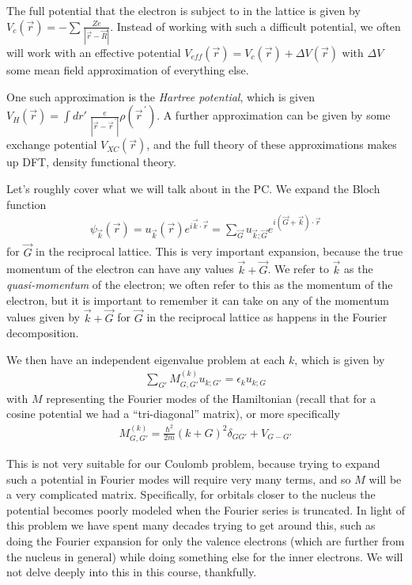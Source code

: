 \documentclass[10pt]{report}
\newcommand{\abs}[1]{\left|#1\right|}
\newcommand{\pvec}[1]{\vec{#1}^{\,\prime}}
\begin{document}
The full potential that the electron is subject to in the lattice is given by $V_c(\vec{r}) = -\sum\limits_{}^{}\frac{Ze}{\abs{\vec{r} - \vec{R}}}$. Instead of working with such a difficult potential, we often will work with an effective potential $V_{eff}(\vec{r}) = V_c(\vec{r}) + \Delta V(\vec{r})$ with $\Delta V$ some mean field approximation of everything else.

One such approximation is the \emph{Hartree potential}, which is given $V_H(\vec{r}) = \int\limits_{}^{}dr'\;\frac{e}{\abs{\vec{r} - \pvec{r}}}\rho(\pvec{r})$. A further approximation can be given by some exchange potential $V_{XC}(\vec{r})$, and the full theory of these approximations makes up DFT, density functional theory.

Let's roughly cover what we will talk about in the PC. We expand the Bloch function 
\begin{align}
    \psi_{\vec{k}}(\vec{r}) = u_{\vec{k}}(\vec{r})e^{i\vec{k} \cdot \vec{r}} = \sum\limits_{\vec{G}}^{}u_{\vec{k};\vec{G}}e^{i\left( \vec{G} + \vec{k} \right)\cdot \vec{r}}
\end{align}
for $\vec{G}$ in the reciprocal lattice. This is very important expansion, because the true momentum of the electron can have any values $\vec{k} + \vec{G}$. We refer to $\vec{k}$ as the \emph{quasi-momentum} of the electron; we often refer to this as the momentum of the electron, but it is important to remember it can take on any of the momentum values given by $\vec{k} + \vec{G}$ for $\vec{G}$ in the reciprocal lattice as happens in the Fourier decomposition.

We then have an independent eigenvalue problem at each $k$, which is given by 
\begin{align}
    \sum\limits_{G'}^{}M_{G,G'}^{(k)}u_{k;G'} = \epsilon_k u_{k;G}
\end{align}
with $M$ representing the Fourier modes of the Hamiltonian (recall that for a cosine potential we had a ``tri-diagonal'' matrix), or more specifically
\begin{align}
    M_{G,G'}^{(k)} = \frac{\hbar^2}{2m}\left( k + G \right)^2 \delta_{GG'} + V_{G-G'}
\end{align}

This is not very suitable for our Coulomb problem, because trying to expand such a potential in Fourier modes will require very many terms, and so $M$ will be a very complicated matrix. Specifically, for orbitals closer to the nucleus the potential becomes poorly modeled when the Fourier series is truncated. In light of this problem we have spent many decades trying to get around this, such as doing the Fourier expansion for only the valence electrons (which are further from the nucleus in general) while doing something else for the inner electrons. We will not delve deeply into this in this course, thankfully.
\end{document}
